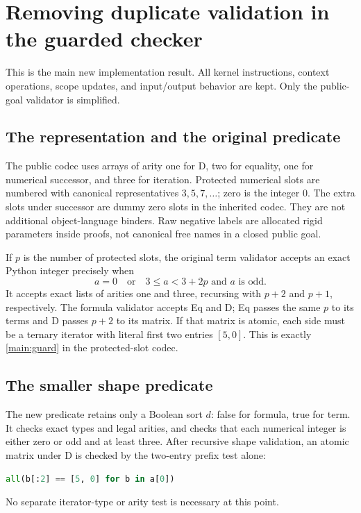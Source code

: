 \documentclass[11pt,letterpaper]{article}
\theoremstyle{definition}\newtheorem{definition}[theorem]{Definition}
\theoremstyle{remark}\newtheorem{remark}[theorem]{Remark}
\begin{document}
\section{Removing duplicate validation in the guarded checker}
\label{sec:factorization}

This is the main new implementation result. All kernel instructions,
context operations, scope updates, and input/output behavior are kept.
Only the public-goal validator is simplified.

\subsection{The representation and the original predicate}

The public codec uses arrays of arity one for D, two for equality,
one for numerical successor, and three for iteration. Protected
numerical slots are numbered with canonical representatives
$3,5,7,\ldots$; zero is the integer $0$. The extra slots under successor
are dummy zero slots in the inherited codec. They are not additional
object-language binders. Raw negative labels are allocated rigid
parameters inside proofs, not canonical free names in a closed public
goal.

If $p$ is the number of protected slots, the original term validator
accepts an exact Python integer precisely when
\[
 a=0\quad\text{or}\quad 3\le a<3+2p\text{ and }a\text{ is odd}.
\]
It accepts exact lists of arities one and three, recursing with $p+2$
and $p+1$, respectively. The formula validator accepts Eq and D;
Eq passes the same $p$ to its terms and D passes $p+2$ to its matrix.
If that matrix is atomic, each side must be a ternary iterator with
literal first two entries $[5,0]$. This is exactly
\eqref{main:guard} in the protected-slot codec.

\subsection{The smaller shape predicate}

The new predicate retains only a Boolean sort $d$: false for formula,
true for term. It checks exact types and legal arities, and checks that
each numerical integer is either zero or odd and at least three.
After recursive shape validation, an atomic matrix under D is checked
by the two-entry prefix test alone:
\begin{lstlisting}[language=Python]
all(b[:2] == [5, 0] for b in a[0])
\end{lstlisting}
No separate iterator-type or arity test is necessary at this point.
\end{document}
